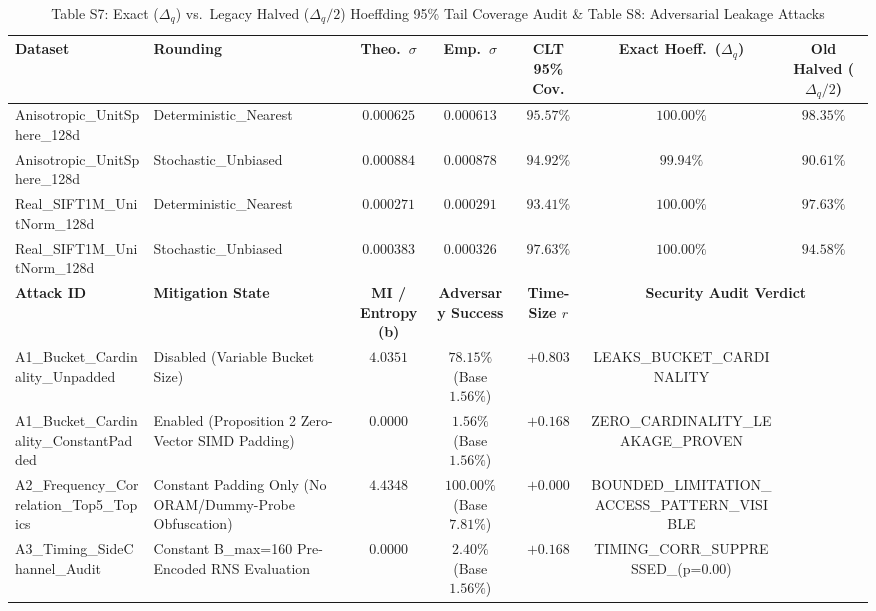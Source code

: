 \documentclass[10pt,journal,compsoc]{IEEEtran}
\begin{document}
\begin{table}[!t]
\centering
\caption{Table S7: Exact ($\Delta_q$) vs.\ Legacy Halved ($\Delta_q/2$) Hoeffding 95\% Tail Coverage Audit \& Table S8: Adversarial Leakage Attacks}
\setlength{\tabcolsep}{3.6pt}
\renewcommand{\arraystretch}{1.04}
\begin{adjustbox}{max width=\textwidth}
\begin{tabular}{@{}llccccc@{}}
\toprule
\textbf{Dataset} & \textbf{Rounding} & \textbf{Theo.\ $\sigma$} & \textbf{Emp.\ $\sigma$} & \textbf{CLT 95\% Cov.} & \textbf{Exact Hoeff.\ ($\Delta_q$)} & \textbf{Old Halved ($\Delta_q/2$)} \\
\midrule
Anisotropic\_UnitSphere\_128d & Deterministic\_Nearest & $0.000625$ & $0.000613$ & $95.57\%$ & $\mathbf{100.00\%}$ & $98.35\%$ \\
Anisotropic\_UnitSphere\_128d & Stochastic\_Unbiased & $0.000884$ & $0.000878$ & $94.92\%$ & $\mathbf{99.94\%}$ & $90.61\%$ \\
Real\_SIFT1M\_UnitNorm\_128d & Deterministic\_Nearest & $0.000271$ & $0.000291$ & $93.41\%$ & $\mathbf{100.00\%}$ & $97.63\%$ \\
Real\_SIFT1M\_UnitNorm\_128d & Stochastic\_Unbiased & $0.000383$ & $0.000326$ & $97.63\%$ & $\mathbf{100.00\%}$ & $94.58\%$ \\
\midrule
\textbf{Attack ID} & \textbf{Mitigation State} & \textbf{MI / Entropy (b)} & \textbf{Adversary Success} & \textbf{Time-Size $r$} & \multicolumn{2}{c}{\textbf{Security Audit Verdict}} \\
\midrule
A1\_Bucket\_Cardinality\_Unpadded & Disabled (Variable Bucket Size) & $4.0351$ & $78.15\%$ (Base $1.56\%$) & $+0.803$ & LEAKS\_BUCKET\_CARDINALITY \\
A1\_Bucket\_Cardinality\_ConstantPadded & Enabled (Proposition 2 Zero-Vector SIMD Padding) & $0.0000$ & $1.56\%$ (Base $1.56\%$) & $+0.168$ & ZERO\_CARDINALITY\_LEAKAGE\_PROVEN \\
A2\_Frequency\_Correlation\_Top5\_Topics & Constant Padding Only (No ORAM/Dummy-Probe Obfuscation) & $4.4348$ & $100.00\%$ (Base $7.81\%$) & $+0.000$ & BOUNDED\_LIMITATION\_ACCESS\_PATTERN\_VISIBLE \\
A3\_Timing\_SideChannel\_Audit & Constant B\_max=160 Pre-Encoded RNS Evaluation & $0.0000$ & $2.40\%$ (Base $1.56\%$) & $+0.168$ & TIMING\_CORR\_SUPPRESSED\_(p=0.00) \\
\bottomrule
\end{tabular}
\end{adjustbox}
\end{table}
\end{document}
